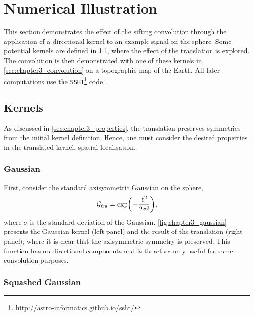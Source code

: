\section{Numerical Illustration}\label{sec:chapter3_numerical_illustration}

This section demonstrates the effect of the sifting convolution through the application of a directional kernel to an example signal on the sphere.
Some potential kernels are defined in \cref{sec:chapter3_kernels}, where the effect of the translation is explored.
The convolution is then demonstrated with one of these kernels in \cref{sec:chapter3_convolution} on a topographic map of the Earth.
All later computations use the \texttt{SSHT}\footnote{\url{http://astro-informatics.github.io/ssht/}} code~\cite{McEwen2011}.

\subsection{Kernels}\label{sec:chapter3_kernels}

As discussed in \cref{sec:chapter3_properties}, the translation preserves symmetries from the initial kernel definition.
Hence, one must consider the desired properties in the translated kernel, \eg{} spatial localisation.

\subsubsection{Gaussian}

First, consider the standard axisymmetric Gaussian on the sphere, \ie{}
%
\begin{equation}
	{\mathcal{G}}_{\ell m}
	= \exp(-\frac{{\ell}^{2}}{2\sigma^{2}}),
\end{equation}
%
where \(\sigma{}\) is the standard deviation of the Gaussian.
\cref{fig:chapter3_gaussian} presents the Gaussian kernel (left panel) and the result of the translation (right panel); where it is clear that the axisymmetric symmetry is preserved.
This function has no directional components and is therefore only useful for some convolution purposes.



\subsubsection{Squashed Gaussian}

